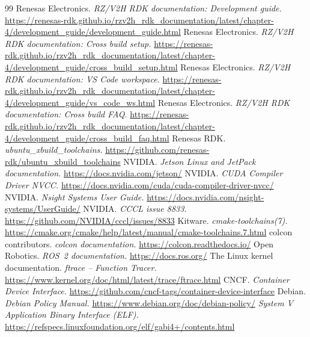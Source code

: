 \documentclass[11pt,a4paper]{article}
\begin{document}
\begin{thebibliography}{99}\small
{} Renesas Electronics. \emph{RZ/V2H RDK documentation: Development guide.}
  \url{https://renesas-rdk.github.io/rzv2h_rdk_documentation/latest/chapter-4/development_guide/development_guide.html}
 Renesas Electronics. \emph{RZ/V2H RDK documentation: Cross build setup.}
  \url{https://renesas-rdk.github.io/rzv2h_rdk_documentation/latest/chapter-4/development_guide/cross_build_setup.html}
 Renesas Electronics. \emph{RZ/V2H RDK documentation: VS Code workspace.}
  \url{https://renesas-rdk.github.io/rzv2h_rdk_documentation/latest/chapter-4/development_guide/vs_code_ws.html}
 Renesas Electronics. \emph{RZ/V2H RDK documentation: Cross build FAQ.}
  \url{https://renesas-rdk.github.io/rzv2h_rdk_documentation/latest/chapter-4/development_guide/cross_build_faq.html}
 Renesas RDK. \emph{ubuntu\_xbuild\_toolchains.} \url{https://github.com/renesas-rdk/ubuntu_xbuild_toolchains}
 NVIDIA. \emph{Jetson Linux and JetPack documentation.} \url{https://docs.nvidia.com/jetson/}
 NVIDIA. \emph{CUDA Compiler Driver NVCC.} \url{https://docs.nvidia.com/cuda/cuda-compiler-driver-nvcc/}
 NVIDIA. \emph{Nsight Systems User Guide.} \url{https://docs.nvidia.com/nsight-systems/UserGuide/}
 NVIDIA. \emph{CCCL issue 8833.} \url{https://github.com/NVIDIA/cccl/issues/8833}
 Kitware. \emph{cmake-toolchains(7).} \url{https://cmake.org/cmake/help/latest/manual/cmake-toolchains.7.html}
 colcon contributors. \emph{colcon documentation.} \url{https://colcon.readthedocs.io/}
 Open Robotics. \emph{ROS~2 documentation.} \url{https://docs.ros.org/}
 The Linux kernel documentation. \emph{ftrace -- Function Tracer.} \url{https://www.kernel.org/doc/html/latest/trace/ftrace.html}
 CNCF. \emph{Container Device Interface.} \url{https://github.com/cncf-tags/container-device-interface}
 Debian. \emph{Debian Policy Manual.} \url{https://www.debian.org/doc/debian-policy/}
 \emph{System V Application Binary Interface (ELF).} \url{https://refspecs.linuxfoundation.org/elf/gabi4+/contents.html}
\end{thebibliography}
\end{document}
